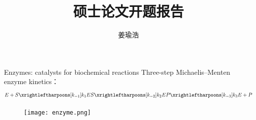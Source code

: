 \documentclass{beamer}
\title[关于酶动力学的环流问题的研究]{硕士论文开题报告}
\author{姜瑜浩}
\institute[CSRC]
{北京计算科学研究中心
\medskip
\textit{yuhaojiang@csrc.ac.cn}
}
\begin{document}
    \frame{\titlepage}
    
	\begin{frame}{Enzymes: catalysts for biochemical reactions}
        Three-step Michaelis–Menten enzyme kinetics：
		$$
		E + S \xrightleftharpoons[k_{-1}]{k_1}
		ES \xrightleftharpoons[k_{-2}]{k_2}
		EP \xrightleftharpoons[k_{-3}]{k_3}
		E + P
		$$
		\begin{figure}[h]
			\centering
			\texttt{[image: enzyme.png]}
	    \end{figure}
	\end{frame}
\end{document}
